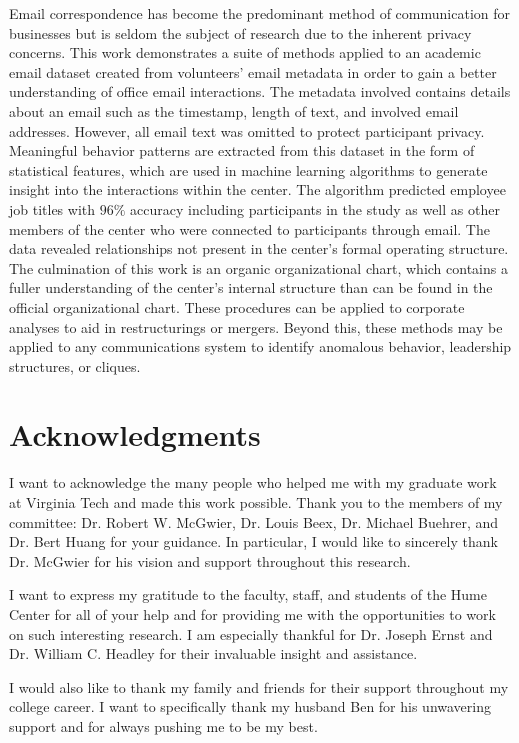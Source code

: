 \documentclass[12pt]{report}
\begin{document}
Email correspondence has become the predominant method of communication for businesses but is seldom the subject of research due to the inherent privacy concerns.
This work demonstrates a suite of methods applied to an academic email dataset created from volunteers' email metadata in order to gain a better understanding of office email interactions.
The metadata involved contains details about an email such as the timestamp, length of text, and  involved email addresses. 
However, all email text was omitted to protect participant privacy.
Meaningful behavior patterns are extracted from this dataset in the form of statistical features, which are used in machine learning algorithms to generate insight into the interactions within the center. 
The algorithm predicted employee job titles with $96\%$ accuracy including participants in the study as well as other members of the center who were connected to participants through email.
The data revealed relationships not present in the center's formal operating structure.
The culmination of this work is an organic organizational chart, which contains a fuller understanding of the center's internal structure than can be found in the official organizational chart.
These procedures can be applied to corporate analyses to aid in restructurings or mergers.
Beyond this, these methods may be applied to any communications system to identify anomalous behavior, leadership structures, or cliques.



\vfill
\pagebreak

\chapter*{Acknowledgments}
I want to acknowledge the many people who helped me with my graduate work at Virginia Tech and made this work possible.  Thank you to the members of my committee: Dr. Robert W. McGwier, Dr. Louis Beex, Dr. Michael Buehrer, and Dr. Bert Huang for your guidance.  In particular, I would like to sincerely thank Dr. McGwier for his vision and support throughout this research.  

I want to express my gratitude to the faculty, staff, and students of the Hume Center for all of your help and for providing me with the opportunities to work on such interesting research.  I am especially thankful for Dr. Joseph Ernst and Dr. William C. Headley for their invaluable insight and assistance.

I would also like to thank my family and friends for their support throughout my college career.  I want to specifically thank my husband Ben for his unwavering support and for always pushing me to be my best.
\end{document}

